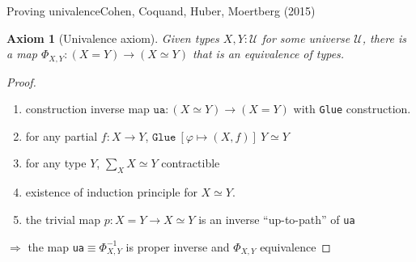 \documentclass[english,handout]{beamer}
\newtheorem{axiom}[theorem]{Axiom}
\newcommand{\fig}[2]{
    \begin{figure}\begin{center}\texttt{[image: figures/\#1]}\caption{#2\label{#1}}\end{center}
    \end{figure}}
\begin{document}
  

  


  
 




\begin{frame}{Proving univalence}{Cohen, Coquand, Huber, Moertberg (2015)}

\begin{axiom}[Univalence axiom]
 Given types $X,Y : \mathcal{U}$ for some universe $\mathcal{U}$, there is a map  $\Phi_{X,Y}: (X=Y) \rightarrow (X \simeq Y)$ that is an equivalence of types. 
\end{axiom}


 

\begin{proof}

\begin{enumerate}

\item construction inverse map $\texttt{ua} : (X\simeq Y) \rightarrow (X = Y)$ with \texttt{Glue} construction.

\item for any partial $f : X \rightarrow Y$, $\texttt{Glue} \ [\varphi \mapsto (X, f)] \ Y \simeq Y$

\item for any type $Y$, $\sum_{X} X \simeq Y$ contractible

\item existence of induction principle for $X\simeq Y$.

\item the trivial map $p : X = Y \rightarrow X \simeq Y$ is an inverse ``up-to-path'' of \texttt{ua}
%  
%  
 
 \end{enumerate}
 
    $\Rightarrow$ the map \texttt{ua}$\equiv \Phi_{X,Y}^{-1}$ is proper inverse and $\Phi_{X,Y}$ equivalence
\end{proof} 

\end{frame}
\end{document}
